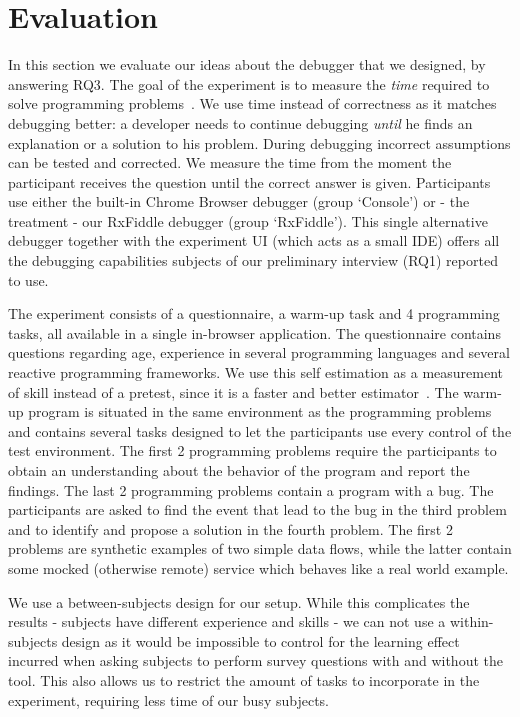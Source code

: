 \section{Evaluation}
\label{section-evaluation}

In this section we evaluate our ideas about the debugger that we designed, by answering RQ3. 
The goal of the experiment is to measure the \textit{time} required to solve programming problems~\cite{ko2015practical}. We use time instead of correctness as it matches debugging better: a developer needs to continue debugging \textit{until} he finds an explanation or a solution to his problem. During debugging incorrect assumptions can be tested and corrected. We measure the time from the moment the participant receives the question until the correct answer is given. Participants use either the built-in Chrome Browser debugger (group `Console') or - the treatment - our RxFiddle debugger (group `RxFiddle'). This single alternative debugger together with the experiment UI (which acts as a small IDE) offers all the debugging capabilities subjects of our preliminary interview (RQ1) reported to use.

The experiment consists of a questionnaire, a warm-up task and 4 programming tasks, all available in a single in-browser application. The questionnaire contains questions regarding age, experience in several programming languages and several reactive programming frameworks. We use this self estimation as a measurement of skill instead of a pretest, since it is a faster and better estimator~\cite{kleinschmager2011rate,feigenspan2012measuring,siegmund2014measuring}. The warm-up program is situated in the same environment as the programming problems and contains several tasks designed to let the participants use every control of the test environment. The first 2 programming problems require the participants to obtain an understanding about the behavior of the program and report the findings. The last 2 programming problems contain a program with a bug. The participants are asked to find the event that lead to the bug in the third problem and to identify and propose a solution in the fourth problem. The first 2 problems are synthetic examples of two simple data flows, while the latter contain some mocked (otherwise remote) service which behaves like a real world example.

We use a between-subjects design for our setup. While this complicates the results - subjects have different experience and skills - we can not use a within-subjects design as it would be impossible to control for the learning effect incurred when asking subjects to perform survey questions with and without the tool. This also allows us to restrict the amount of tasks to incorporate in the experiment, requiring less time of our busy subjects.

